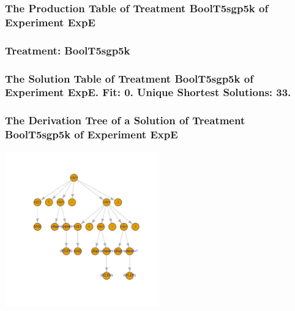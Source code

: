 \documentclass[18pt,c]{beamer}
\begin{document}
 \begin{frame}
 \fontsize{8pt}{9pt}\selectfont
 \frametitle{ The Production Table of Treatment BoolT5sgp5k of Experiment ExpE }

 \label{ExpEGrammarTable012.tex}  
 \end{frame}

 \begin{frame}
 \fontsize{8pt}{9pt}\selectfont
 \frametitle{ Treatment: BoolT5sgp5k }

 \label{ExpEStatsTable011.tex}  
 \end{frame}

 \begin{frame}
 \fontsize{8pt}{9pt}\selectfont
 \frametitle{ The Solution Table of Treatment BoolT5sgp5k of Experiment ExpE. Fit: 0. Unique Shortest Solutions: 33. }

 \label{ExpESolutionTable008.tex}  
 \end{frame}

 \begin{frame}
 \frametitle{ The Derivation Tree of a Solution of Treatment BoolT5sgp5k of Experiment ExpE }
 \begin{center}
\includegraphics[width=0.5\textwidth, angle=0]
{ExpEDerivationTreeFigure008.pdf}
 \end{center}
 \label{report/ExpEDerivationTreeFigure008.pdf}  
 \end{frame}
\end{document}

